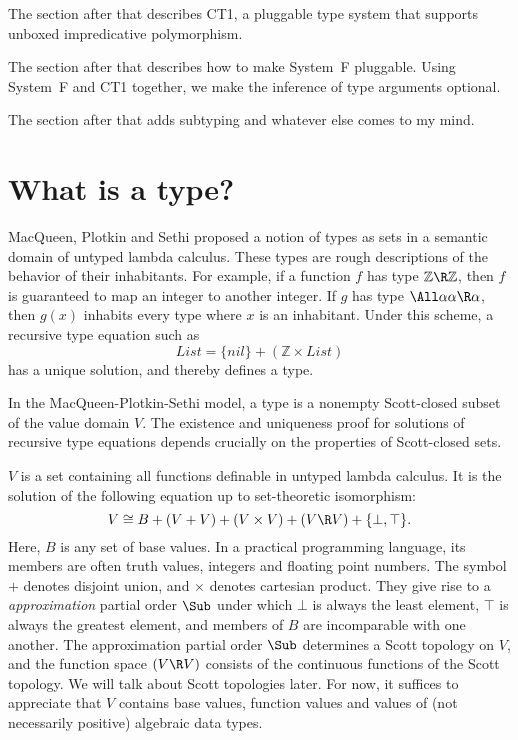 \documentclass{amsart}
\begin{document}
The section after that describes CT1, a pluggable type system
that supports unboxed impredicative polymorphism.

The section after that describes how to make System~F pluggable.
Using System~F and CT1 together, we make the inference of type
arguments optional.

The section after that adds subtyping and whatever else comes to
my mind.

\section{What is a type?}

MacQueen, Plotkin and Sethi proposed a notion of types as sets in
a semantic domain of untyped lambda calculus. These types are
rough descriptions of the behavior of their inhabitants. For
example, if a function $f$ has type $\mathbb Z\R\mathbb Z$, then
$f$ is guaranteed to map an integer to another integer. If $g$
has type $\All\alpha \alpha\R\alpha$, then $g(x)$ inhabits every
type where $x$ is an inhabitant. Under this scheme, a recursive
type equation such as
\[
\mathit{List} = \{\mathit{nil}\} + (\mathbb Z \times \mathit{List})
\]
has a unique solution, and thereby defines a type.

In the MacQueen-Plotkin-Sethi model, a type is a nonempty
Scott-closed subset of the value domain $V$. The existence and
uniqueness proof for solutions of recursive type equations
depends crucially on the properties of Scott-closed sets.



$V$ is a set containing all functions definable in untyped lambda
calculus. It is the solution of the following equation up to
set-theoretic isomorphism:
\begin{equation}\label{domain-eq}
V \cong B + (V + V) + (V \times V) + (V \R V) + \{\bot, \top\}.
\end{equation}
Here, $B$ is any set of base values. In a practical programming
language, its members are often truth values, integers and
floating point numbers. The symbol $+$ denotes disjoint union,
and $\times$ denotes cartesian product. They give rise to a
\emph{approximation} partial order $\Sub$ under which $\bot$ is
always the least element, $\top$ is always the greatest element,
and members of $B$ are incomparable with one another. The
approximation partial order $\Sub$ determines a Scott topology on
$V$, and the function space $(V \R V)$ consists of the continuous
functions of the Scott topology. We will talk about Scott
topologies later. For now, it suffices to appreciate that $V$
contains base values, function values and values of (not
necessarily positive) algebraic data types.
\end{document}
